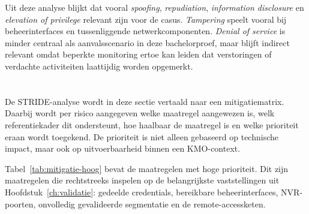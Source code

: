 Uit deze analyse blijkt dat vooral \textit{spoofing}, \textit{repudiation}, \textit{information disclosure} en \textit{elevation of privilege} relevant zijn voor de casus. \textit{Tampering} speelt vooral bij beheerinterfaces en tussenliggende netwerkcomponenten. \textit{Denial of service} is minder centraal als aanvalsscenario in deze bachelorproef, maar blijft indirect relevant omdat beperkte monitoring ertoe kan leiden dat verstoringen of verdachte activiteiten laattijdig worden opgemerkt.

\section{}%
\label{sec:mitigatiematrix}

De STRIDE-analyse wordt in deze sectie vertaald naar een mitigatiematrix. Daarbij wordt per risico aangegeven welke maatregel aangewezen is, welk referentiekader dit ondersteunt, hoe haalbaar de maatregel is en welke prioriteit eraan wordt toegekend. De prioriteit is niet alleen gebaseerd op technische impact, maar ook op uitvoerbaarheid binnen een KMO-context.

Tabel~\ref{tab:mitigatie-hoog} bevat de maatregelen met hoge prioriteit. Dit zijn maatregelen die rechtstreeks inspelen op de belangrijkste vaststellingen uit Hoofdstuk~\ref{ch:validatie}: gedeelde credentials, bereikbare beheerinterfaces, NVR-poorten, onvolledig gevalideerde segmentatie en de remote-accessketen.

